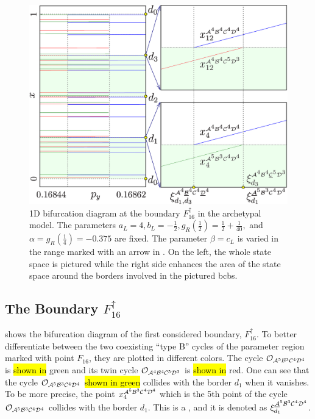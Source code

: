 \begin{figure}
	\centering
	\includegraphics[width=.7 \textwidth]{../Figures/6/6.6/result.png}
	\caption[1D bifurcation diagram at the boundary $F_{16}^\uparrow$ in the archetypal model]{
		1D bifurcation diagram at the boundary $F_{16}^\uparrow$ in the archetypal model.
		The parameters $a_L = 4, b_L = -\frac{1}{2}, g_R\left(\frac{1}{2}\right) = \frac{1}{2} + \frac{1}{40},$ and $\alpha = g_R\left(\frac{1}{4}\right) = -0.375$ are fixed.
		The parameter $\beta = c_L$ is varied in the range marked with an arrow in .
		On the left, the whole state space is pictured while the right side enhances the area of the state space around the borders involved in the pictured \glspl{bcb}.
	}
	\label{fig:arch.bif.F.up}
\end{figure}

\clearpage
\subsection{The Boundary $F_{16}^\uparrow$}
\label{sec:arch.bif.U}

 shows the bifurcation diagram of the first considered boundary, $F_{16}^\uparrow$.
To better differentiate between the two coexisting ``type B'' cycles of the parameter region marked with point $F_{16}$, they are plotted in different colors.
The cycle $\mathcal{O}_{\mathcal{A}^5\mathcal{B}^3\mathcal{C}^4\mathcal{D}^4}$ is \hl{shown in} green and its twin cycle $\mathcal{O}_{\mathcal{A}^4\mathcal{B}^4\mathcal{C}^5\mathcal{D}^3}$ is \hl{shown in}  red.
One can see that the cycle $\mathcal{O}_{\mathcal{A}^5\mathcal{B}^3\mathcal{C}^4\mathcal{D}^4}$ \hl{shown in green} collides with the border $d_1$ when it vanishes.
To be more precise, the point $x_4^{\mathcal{A}^5\mathcal{B}^3\mathcal{C}^4\mathcal{D}^4}$ which is the 5th point of the cycle $\mathcal{O}_{\mathcal{A}^5\mathcal{B}^3\mathcal{C}^4\mathcal{D}^4}$ collides with the border $d_1$.
This is a \hl{}, and it is denoted as $\xi_{d_1}^{\underline{\mathcal{A}}^5\mathcal{B}^3\mathcal{C}^4\mathcal{D}^4}$.

